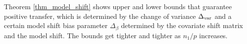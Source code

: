 Theorem \ref{thm_model_shift} shows upper and lower bounds that guarantee positive transfer, which is determined by the change of variance $\Delta_{\text{var}}$ and a certain model shift bias parameter $\Delta_{\beta}$ determined by the covariate shift matrix and the model shift.
The bounds get tighter and tighter as $n_1 / p$ increases.
%








